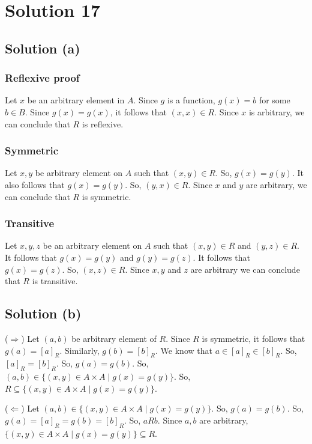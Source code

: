 \documentclass{article}
\begin{document}
\section{Solution 17}
\subsection{Solution (a)}
\subsubsection{Reflexive proof}
Let $x$ be an arbitrary element in $A$. Since $g$ is a function, $g(x)
= b$ for some $b \in B$. Since $g(x) = g(x)$, it follows that $(x,x)
\in R$. Since $x$ is arbitrary, we can conclude that $R$ is reflexive.

\subsubsection{Symmetric}
Let $x,y$ be arbitrary element on $A$ such that $(x,y) \in R$. So,
$g(x) = g(y)$. It also follows that $g(x) = g(y)$. So, $(y,x) \in R$.
Since $x$ and $y$ are arbitrary, we can conclude that $R$ is
symmetric.

\subsubsection{Transitive}
Let $x,y,z$ be an arbitrary element on $A$ such that $(x,y) \in R$ and
$(y,z) \in R$. It follows that $g(x) = g(y)$ and $g(y) = g(z)$. It
follows that $g(x) = g(z)$. So, $(x,z) \in R$. Since $x,y$ and $z$ are
arbitrary we can conclude that $R$ is transitive.

\subsection{Solution (b)}
($\Rightarrow$) Let $(a,b)$ be arbitrary element of $R$. Since $R$ is
symmetric, it follows that $g(a) = [a]_R$. Similarly, $g(b) = [b]_R$.
We know that $a \in [a]_R \in [b]_R$. So, $[a]_R = [b]_R$. So, $g(a) =
g(b)$. So, $(a,b) \in \{(x,y) \in A \times A \mid g(x) = g(y)\}$. So,
$R \subseteq \{(x,y) \in A \times A \mid g(x) = g(y)\}$.

($\Leftarrow$) Let $(a,b) \in \{(x,y) \in A \times A \mid g(x) =
g(y)\}$. So, $g(a) = g(b)$. So, $g(a) = [a]_R = g(b) = [b]_R$. So,
$aRb$. Since $a,b$ are arbitrary, $\{(x,y) \in A \times A \mid g(x) =
g(y)\} \subseteq R$.
\end{document}
